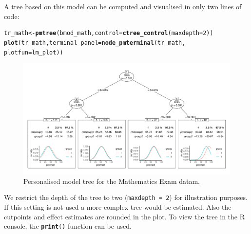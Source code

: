 \documentclass{josr}\usepackage[]{graphicx}\usepackage[]{color}
\makeatletter
\def\maxwidth{ %
  \ifdim\Gin@nat@width>\linewidth
    \linewidth
  \else
    \Gin@nat@width
  \fi
}
\newcommand{\hlnum}[1]{\textcolor[rgb]{0.686,0.059,0.569}{#1}}%
\newcommand{\hlstd}[1]{\textcolor[rgb]{0.345,0.345,0.345}{#1}}%
\newcommand{\hlkwb}[1]{\textcolor[rgb]{0.69,0.353,0.396}{#1}}%
\newcommand{\hlkwc}[1]{\textcolor[rgb]{0.333,0.667,0.333}{#1}}%
\newcommand{\hlkwd}[1]{\textcolor[rgb]{0.737,0.353,0.396}{\textbf{#1}}}%
\newenvironment{kframe}{%
 \def\at@end@of@kframe{}%
 \ifinner\ifhmode%
  \def\at@end@of@kframe{\end{minipage}}%
  \begin{minipage}{\columnwidth}%
 \fi\fi%
 \def\FrameCommand##1{\hskip\@totalleftmargin \hskip-\fboxsep
 \colorbox{shadecolor}{##1}\hskip-\fboxsep
     \hskip-\linewidth \hskip-\@totalleftmargin \hskip\columnwidth}%
 \MakeFramed {\advance\hsize-\width
   \@totalleftmargin\z@ \linewidth\hsize
   \@setminipage}}%
 {\par\unskip\endMakeFramed%
 \at@end@of@kframe}
\newenvironment{knitrout}{}{} %
\newcommand{\new}[1]{{\color{blue} #1}}
\makeatother
\begin{document}
A tree based on this model can be computed and visualised in only two lines of
code:
\begin{knitrout}
\color{fgcolor}\begin{kframe}
\begin{alltt}
\hlstd{tr_math} \hlkwb{<-} \hlkwd{pmtree}\hlstd{(bmod_math,} \hlkwc{control} \hlstd{=} \hlkwd{ctree_control}\hlstd{(}\hlkwc{maxdepth} \hlstd{=} \hlnum{2}\hlstd{))}
\hlkwd{plot}\hlstd{(tr_math,} \hlkwc{terminal_panel} \hlstd{=} \hlkwd{node_pmterminal}\hlstd{(tr_math,}
                                               \hlkwc{plotfun} \hlstd{= lm_plot))}
\end{alltt}
\end{kframe}\begin{figure}

{\centering \includegraphics[width=\maxwidth]{figure/math_tree-1} 

}

\caption[Personalised model tree for the Mathematics Exam datam]{Personalised model tree for the Mathematics Exam datam.}\label{fig:math_tree}
\end{figure}


\end{knitrout}
\new{
We restrict the depth of the tree to two (\texttt{\hlstd{maxdepth} \hlkwb{=} \hlnum{2}}) for
illustration purposes. If this setting is not used a more complex tree would be
estimated. Also the cutpoints and effect estimates are rounded in the plot.  To
view the tree in the R console, the \texttt{\hlkwd{print}\hlstd{()}} function can be
used.
}
\end{document}
